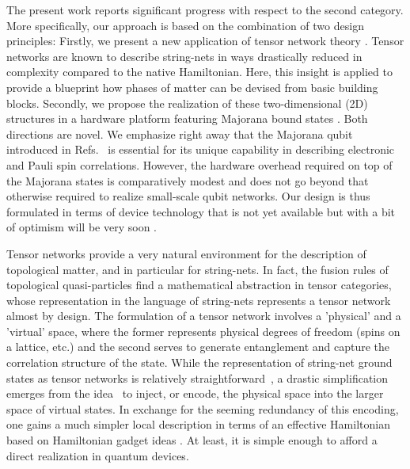 \documentclass[twocolumn,floats,prx,showpacs]{revtex4-1}
\begin{document}
The present work reports significant progress with respect to the second category. 
More specifically, our approach is based on the combination of two design principles: Firstly, we present a new application of
 tensor network theory \cite{Orus-AnnPhys-2014,AreaReview,VerstraeteBig,SchuchReview}.
 Tensor networks are known to describe string-nets in ways drastically reduced in complexity compared to the native Hamiltonian. Here,
  this insight is applied to provide
 a blueprint how phases of matter can be devised from basic building blocks.
Secondly, we propose the realization of these two-dimensional (2D) structures in a hardware platform featuring Majorana bound states \cite{Alicea2012,Leijnse2012,Beenakker2013,Sarma2015,Aguado2017,Lutchyn2018,Mourik2012,Albrecht2016,Deng2016,Nichele2017,Gazi2017,Zhang2018}. Both directions are novel.  We emphasize right away that the Majorana qubit introduced in Refs.~\cite{Beri2012,Beri2013,Altland2013,Plugge2017,Karzig2017} is essential for its unique capability in describing electronic and Pauli spin correlations. However, the hardware overhead required on top of the Majorana states is comparatively modest and does not go beyond that otherwise required to realize small-scale qubit networks. Our design is thus formulated in terms of device technology that is not yet available  but with a bit of optimism will be very soon \cite{Lutchyn2018}.

Tensor networks provide a very natural environment for the description of topological matter, and in particular for string\nobreakdash -nets. In fact, the fusion rules of topological quasi-particles find a mathematical abstraction in tensor categories,  whose representation in  the language of string-nets represents a tensor network almost by design. The formulation of a tensor network involves a   'physical' and a 'virtual' space, where the former represents physical  degrees of freedom (spins on a lattice, etc.) and the second serves to generate entanglement and capture the correlation structure of the state.  While the representation of string-net ground states as tensor networks is relatively straightforward~\cite{Gu2009,Buerschaper2009}, a drastic simplification emerges from the idea~\cite{Schuch_MPS,1409.2150,FermionicMPO,PhysRevB.95.245127} to inject, or encode, the physical space into the larger space of virtual states. In exchange for the seeming redundancy of this encoding, one gains a much simpler local description in terms of an effective Hamiltonian \cite{Brell2014PEPS} based on Hamiltonian gadget ideas \cite{Kempe-SIAM-2006, PhysRevA.77.062329}. At least, it is simple enough to afford a direct realization in quantum devices.
\end{document}
